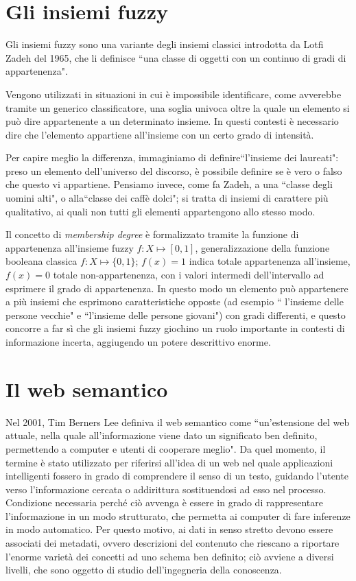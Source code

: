 \documentclass[12pt,a4paper]{report}
\begin{document}
\section{Gli insiemi fuzzy}

Gli insiemi fuzzy sono una variante degli insiemi classici introdotta da Lotfi Zadeh del 1965, che li definisce ``una classe di oggetti con un continuo di gradi di appartenenza"\cite{fuzzysetspaper}.

Vengono utilizzati in situazioni in cui è impossibile identificare, come avverebbe tramite un generico classificatore, una soglia univoca oltre la quale un elemento si può dire appartenente a un determinato insieme. In questi contesti è necessario dire che l'elemento appartiene all'insieme con un certo grado di intensità. 

Per capire meglio la differenza, immaginiamo di definire``l'insieme dei laureati": preso un elemento dell'universo del discorso, è possibile definire  se è vero o falso che questo vi appartiene. Pensiamo invece, come fa Zadeh, a una ``classe degli uomini alti"\cite{fuzzysetspaper}, o alla``classe dei caffè dolci";  si tratta di insiemi di carattere più qualitativo, ai quali non tutti gli elementi appartengono allo stesso modo. 

 Il concetto di \emph{membership degree} è formalizzato tramite la funzione di appartenenza all'insieme fuzzy $f: X \mapsto [0,1]$, generalizzazione della funzione booleana classica $f: X \mapsto \{0,1\}$;  $f(x) = 1 $ indica totale appartenenza all'insieme, $f(x) = 0 $ totale non-appartenenza, con i valori intermedi dell'intervallo ad esprimere il grado di appartenenza.
In questo modo un elemento può appartenere a più insiemi che esprimono caratteristiche opposte (ad esempio `` l'insieme delle persone vecchie" e ``l'insieme delle persone giovani"\cite{fuzzysystemspaper}) con gradi differenti, e questo concorre a far sì che gli insiemi fuzzy giochino un ruolo importante in contesti di informazione incerta, aggiugendo un potere descrittivo enorme.


\section{Il web semantico}
Nel 2001, Tim Berners Lee definiva il web semantico come ``un'estensione del web attuale, nella quale all'informazione viene dato un significato ben definito, permettendo a computer e utenti di cooperare meglio"\cite{semanticWebPaper}.
Da quel momento, il termine è stato utilizzato per riferirsi all'idea di un web nel quale applicazioni intelligenti fossero in grado di comprendere il senso di un testo, guidando l'utente verso l'informazione cercata o addirittura sostituendosi ad esso nel processo.
Condizione necessaria perché ciò avvenga è essere in grado di rappresentare l'informazione in un modo strutturato, che permetta ai computer di fare inferenze in modo automatico. Per questo motivo, ai dati in senso stretto devono essere associati dei metadati, ovvero descrizioni del contenuto che riescano a riportare l'enorme varietà dei concetti ad uno schema ben definito; ciò avviene a diversi livelli, che sono oggetto di studio dell'ingegneria della conoscenza.
\end{document}
